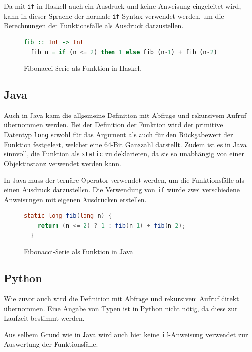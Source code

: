\documentclass[11pt, parskip=half]{scrartcl}       %
\begin{document}
Da mit \texttt{if} in Haskell auch ein Ausdruck und keine Anweisung eingeleitet wird, kann in dieser Sprache der normale \texttt{if}-Syntax verwendet werden, um die Berechnungen der Funktionsfälle als Ausdruck darzustellen.

\begin{figure}[h]
  \centering
\begin{lstlisting}[language=haskell]
  fib :: Int -> Int
  fib n = if (n <= 2) then 1 else fib (n-1) + fib (n-2)
\end{lstlisting}  
  \caption{Fibonacci-Serie als Funktion in Haskell}
  \label{fig:code-haskell}
\end{figure}

\subsection{Java}

Auch in Java kann die allgemeine Definition mit Abfrage und rekursivem Aufruf übernommen werden.
Bei der Definition der Funktion wird der primitive Datentyp \texttt{long} sowohl für das Argument als auch für den Rückgabewert der Funktion festgelegt, welcher eine 64-Bit Ganzzahl darstellt.
Zudem ist es in Java sinnvoll, die Funktion als \texttt{static} zu deklarieren, da sie so unabhängig von einer Objektinstanz verwendet werden kann.

In Java muss der ternäre Operator verwendet werden, um die Funktionsfälle als einen Ausdruck darzustellen.
Die Verwendung von \texttt{if} würde zwei verschiedene Anweisungen mit eigenen Ausdrücken erstellen.

\begin{figure}[h]
  \centering
\begin{lstlisting}[language=java]
  static long fib(long n) {
    return (n <= 2) ? 1 : fib(n-1) + fib(n-2);
  }
\end{lstlisting}  
  \caption{Fibonacci-Serie als Funktion in Java}
  \label{fig:code-java}
\end{figure}


\subsection{Python}

Wie zuvor auch wird die Definition mit Abfrage und rekursivem Aufruf direkt übernommen.
Eine Angabe von Typen ist in Python nicht nötig, da diese zur Laufzeit bestimmt werden.

Aus selbem Grund wie in Java wird auch hier keine \texttt{if}-Anweisung verwendet zur Auswertung der Funktionsfälle.
\end{document}

